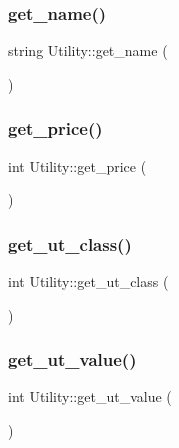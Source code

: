 \subsubsection{\texorpdfstring{get\+\_\+name()}{get\_name()}}
{\footnotesize\ttfamily string Utility\+::get\+\_\+name (\begin{DoxyParamCaption}{ }\end{DoxyParamCaption})}

\mbox{\label{classUtility_a26bc0e559ef6d73c99a8f71e01fa11fa}} 
\subsubsection{\texorpdfstring{get\+\_\+price()}{get\_price()}}
{\footnotesize\ttfamily int Utility\+::get\+\_\+price (\begin{DoxyParamCaption}{ }\end{DoxyParamCaption})}

\mbox{\label{classUtility_a73bf8de65fa561a3461c1fbc23619290}} 
\subsubsection{\texorpdfstring{get\+\_\+ut\+\_\+class()}{get\_ut\_class()}}
{\footnotesize\ttfamily int Utility\+::get\+\_\+ut\+\_\+class (\begin{DoxyParamCaption}{ }\end{DoxyParamCaption})}

\mbox{\label{classUtility_ae2631ea454dd742eac813524634152d3}} 
\subsubsection{\texorpdfstring{get\+\_\+ut\+\_\+value()}{get\_ut\_value()}}
{\footnotesize\ttfamily int Utility\+::get\+\_\+ut\+\_\+value (\begin{DoxyParamCaption}{ }\end{DoxyParamCaption})}

